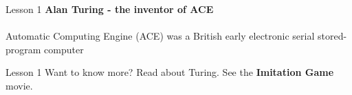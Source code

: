 \documentclass[aspectratio=1610]{beamer}
\begin{document}
\begin{frame}
\end{frame}


\begin{frame}{Lesson 1}{}
\LARGE
\textbf{Alan Turing - the inventor of ACE}\\~\\
Automatic Computing Engine (ACE) was a British early electronic
serial stored-program computer
\end{frame}


\begin{frame}
\end{frame}

\begin{frame}{Lesson 1}{}
\Huge
 Want to know more? Read about Turing. See the \textbf{Imitation Game} movie.
 \end{frame}
 

\begin{frame}
\end{frame}
\end{document}
